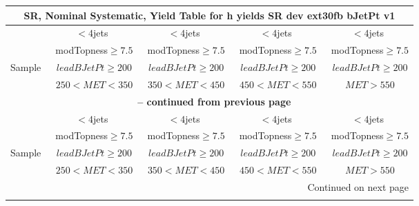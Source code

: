 \documentclass{article}
\begin{document}
\begin{longtable}{|l|c|c|c|c|} 
 
\multicolumn{5}{c}{ SR, Nominal Systematic, Yield Table for h yields SR dev ext30fb bJetPt v1 }\\* \hline 
  & $<4$jets  & $<4$jets  & $<4$jets  & $<4$jets \\* 
  & ~modTopness$\ge7.5$  & ~modTopness$\ge7.5$  & ~modTopness$\ge7.5$  & ~modTopness$\ge7.5$ \\* 
Sample  & ~$leadBJetPt\ge200$  & ~$leadBJetPt\ge200$  & ~$leadBJetPt\ge200$  & ~$leadBJetPt\ge200$ \\* 
  & ~$250<MET<350$  & ~$350<MET<450$  & ~$450<MET<550$  & ~$MET>550$ \\* 
\hline \hline 
\endfirsthead 
 
\multicolumn{5}{c}{{\bfseries \tablename\ \thetable{} -- continued from previous page}}\\* \hline 
  & $<4$jets  & $<4$jets  & $<4$jets  & $<4$jets \\* 
  & ~modTopness$\ge7.5$  & ~modTopness$\ge7.5$  & ~modTopness$\ge7.5$  & ~modTopness$\ge7.5$ \\* 
Sample  & ~$leadBJetPt\ge200$  & ~$leadBJetPt\ge200$  & ~$leadBJetPt\ge200$  & ~$leadBJetPt\ge200$ \\* 
  & ~$250<MET<350$  & ~$350<MET<450$  & ~$450<MET<550$  & ~$MET>550$ \\* 
\hline \hline 
\endhead 
 
\multicolumn{5}{|r|}{{Continued on next page}}\\* \hline 
\endfoot 
 
 
\endlastfoot 
 

\end{longtable}
\end{document}
